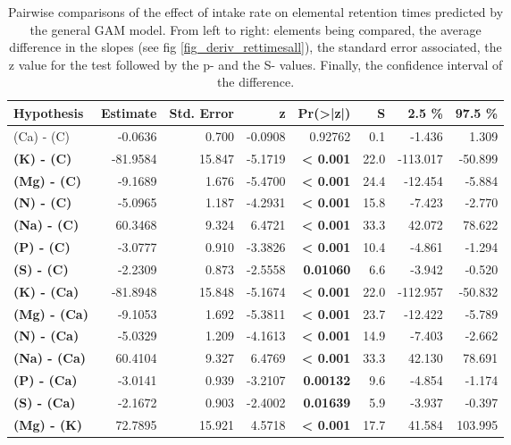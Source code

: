\begin{table}[H]
\centering
\caption{\label{tab:table_pairs_d_rt}Pairwise comparisons of the effect of intake rate on elemental retention times predicted by the general GAM model. From left to right: elements being compared, the average difference in the slopes (see fig \ref{fig_deriv_rettimesall}), the standard error associated, the z value for the test followed by the p- and the S- values. Finally, the confidence interval of the difference.}
\centering
\begin{tabular}[t]{>{}lrrr>{}rrrr}
\toprule
\textbf{Hypothesis} & \textbf{Estimate} & \textbf{Std. Error} & \textbf{z} & \textbf{Pr(>|z|)} & \textbf{S} & \textbf{2.5 \%} & \textbf{97.5 \%}\\
\midrule
(Ca) - (C) & -0.0636 & 0.700 & -0.0908 & 0.92762 & 0.1 & -1.436 & 1.309\\
\textbf{(K) - (C)} & -81.9584 & 15.847 & -5.1719 & \textbf{< 0.001} & 22.0 & -113.017 & -50.899\\
\textbf{(Mg) - (C)} & -9.1689 & 1.676 & -5.4700 & \textbf{< 0.001} & 24.4 & -12.454 & -5.884\\
\textbf{(N) - (C)} & -5.0965 & 1.187 & -4.2931 & \textbf{< 0.001} & 15.8 & -7.423 & -2.770\\
\textbf{(Na) - (C)} & 60.3468 & 9.324 & 6.4721 & \textbf{< 0.001} & 33.3 & 42.072 & 78.622\\
\textbf{(P) - (C)} & -3.0777 & 0.910 & -3.3826 & \textbf{< 0.001} & 10.4 & -4.861 & -1.294\\
\textbf{(S) - (C)} & -2.2309 & 0.873 & -2.5558 & \textbf{0.01060} & 6.6 & -3.942 & -0.520\\
\textbf{(K) - (Ca)} & -81.8948 & 15.848 & -5.1674 & \textbf{< 0.001} & 22.0 & -112.957 & -50.832\\
\textbf{(Mg) - (Ca)} & -9.1053 & 1.692 & -5.3811 & \textbf{< 0.001} & 23.7 & -12.422 & -5.789\\
\textbf{(N) - (Ca)} & -5.0329 & 1.209 & -4.1613 & \textbf{< 0.001} & 14.9 & -7.403 & -2.662\\
\textbf{(Na) - (Ca)} & 60.4104 & 9.327 & 6.4769 & \textbf{< 0.001} & 33.3 & 42.130 & 78.691\\
\textbf{(P) - (Ca)} & -3.0141 & 0.939 & -3.2107 & \textbf{0.00132} & 9.6 & -4.854 & -1.174\\
\textbf{(S) - (Ca)} & -2.1672 & 0.903 & -2.4002 & \textbf{0.01639} & 5.9 & -3.937 & -0.397\\
\textbf{(Mg) - (K)} & 72.7895 & 15.921 & 4.5718 & \textbf{< 0.001} & 17.7 & 41.584 & 103.995\\

\end{tabular}
\end{table}
